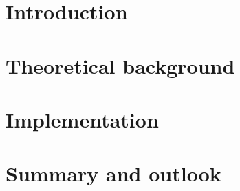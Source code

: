 \single{\documentclass[12pt,a4paper,oneside,german,english]{book}}
\begin{document}
%

\newpage
\tableofcontents


\mainmatter





\chapter{Introduction}
\label{chap:intro}


\chapter{Theoretical background}
\label{chap:theory}


\chapter{Implementation}
\label{chap:implementation}


% 

\chapter{Summary and outlook}
\label{chap:summary}

\end{document}
